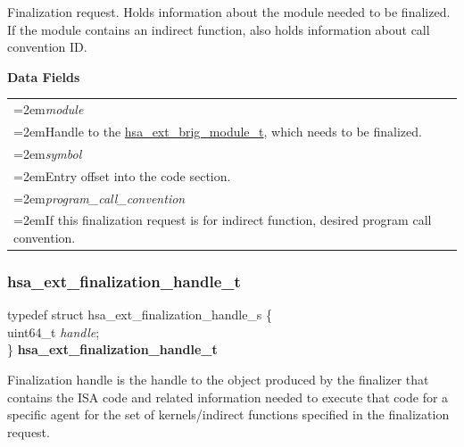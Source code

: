 \documentclass[final,oneside]{book}
\newcommand{\reffld}[1]{\textit{#1}}
\newenvironment{mylongtable}{\rowcolors{0}{lightgray}{lightgray}\longtable} {
\endlongtable}
\begin{document}
\vspace{-5mm}Finalization request. Holds information about the module needed to be finalized. If the module contains an indirect function, also holds information about call convention ID.

\noindent\textbf{Data Fields}\\[-6mm]
\begin{longtable}{@{}>{\hangindent=2em}p{\textwidth}}
\hypertarget{hsa_\-ext_\-finalization_\-request_\-t.module}{\reffld{module}}\\\hspace{2em}Handle to the \hyperlink{group__ext-finalizer_1ga104477d24306200a2847b44c325e312a}{hsa_\-ext_\-brig_\-module_\-t}, which needs to be finalized.\\[2mm]
\hypertarget{hsa_\-ext_\-finalization_\-request_\-t.symbol}{\reffld{symbol}}\\\hspace{2em}Entry offset into the code section.\\[2mm]
\hypertarget{hsa_\-ext_\-finalization_\-request_\-t.program_\-call_\-convention}{\reffld{program_\-call_\-convention}}\\\hspace{2em}If this finalization request is for indirect function, desired program call convention.
\end{longtable}



\subsubsection{hsa_\-ext_\-finalization_\-handle_\-t}
\vspace{-5.5mm}\begin{mylongtable}{@{}p{\textwidth}}
\rule{0pt}{3ex}typedef struct  hsa_ext_finalization_handle_s \{\\
\hspace{1.7em}uint64_\-t \reffld{handle};\\
\}  \hypertarget{group__ext-finalizer_1ga93de8cedb07abeabea546df3a621ec1a}{\textbf{hsa_\-ext_\-finalization_\-handle_\-t}}\rule[-2ex]{0pt}{0pt}
\end{mylongtable}

\vspace{-5mm}Finalization handle is the handle to the object produced by the finalizer that contains the ISA code and related information needed to execute that code for a specific agent for the set of kernels/indirect functions specified in the finalization request.
\end{document}
